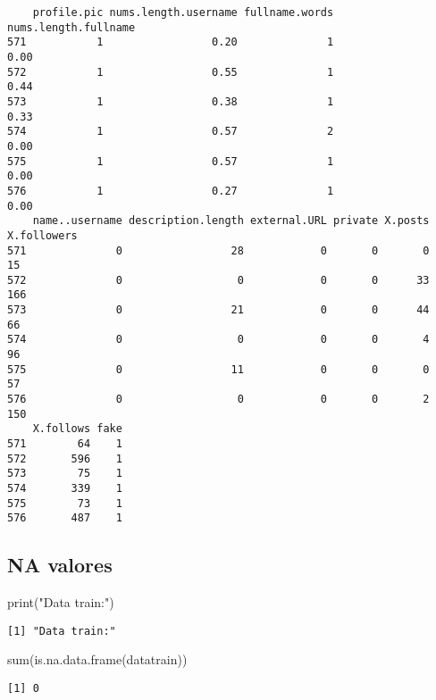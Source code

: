 \documentclass[
  letterpaper,
  DIV=11,
  numbers=noendperiod]{scrreprt}
\newenvironment{Shaded}{\begin{snugshade}}{\end{snugshade}}
\newcommand{\FunctionTok}[1]{\textcolor[rgb]{0.28,0.35,0.67}{#1}}
\newcommand{\NormalTok}[1]{\textcolor[rgb]{0.00,0.23,0.31}{#1}}
\newcommand{\StringTok}[1]{\textcolor[rgb]{0.13,0.47,0.30}{#1}}
\begin{document}
\begin{verbatim}
    profile.pic nums.length.username fullname.words nums.length.fullname
571           1                 0.20              1                 0.00
572           1                 0.55              1                 0.44
573           1                 0.38              1                 0.33
574           1                 0.57              2                 0.00
575           1                 0.57              1                 0.00
576           1                 0.27              1                 0.00
    name..username description.length external.URL private X.posts X.followers
571              0                 28            0       0       0          15
572              0                  0            0       0      33         166
573              0                 21            0       0      44          66
574              0                  0            0       0       4          96
575              0                 11            0       0       0          57
576              0                  0            0       0       2         150
    X.follows fake
571        64    1
572       596    1
573        75    1
574       339    1
575        73    1
576       487    1
\end{verbatim}

\hypertarget{na-valores}{%
\subsection{NA valores}\label{na-valores}}

\begin{Shaded}
\begin{Highlighting}[]
\FunctionTok{print}\NormalTok{(}\StringTok{"Data train:"}\NormalTok{)}
\end{Highlighting}
\end{Shaded}

\begin{verbatim}
[1] "Data train:"
\end{verbatim}

\begin{Shaded}
\begin{Highlighting}[]
\FunctionTok{sum}\NormalTok{(}\FunctionTok{is.na.data.frame}\NormalTok{(datatrain))}
\end{Highlighting}
\end{Shaded}

\begin{verbatim}
[1] 0
\end{verbatim}
\end{document}
